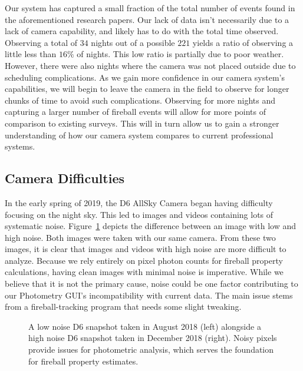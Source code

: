 Our system has captured a small fraction of the total number of events found in the aforementioned research papers.
Our lack of data isn't necessarily due to a lack of camera capability, and likely has to do with the total time observed. 
Observing a total of $34$ nights out of a possible $221$ yields a ratio of observing a little less than $16\%$ of nights. 
This low ratio is partially due to poor weather.
However, there were also nights where the camera was not placed outside due to scheduling complications.
As we gain more confidence in our camera system's capabilities, we will begin to leave the camera in the field to observe for longer chunks of time to avoid such complications.
Observing for more nights and capturing a larger number of fireball events will allow for more points of comparison to existing surveys.
This will in turn allow us to gain a stronger understanding of how our camera system compares to current professional systems.


\subsection{Camera Difficulties}

In the early spring of 2019, the D6 AllSky Camera began having difficulty focusing on the night sky.
This led to images and videos containing lots of systematic noise.  
Figure~\ref{camera_noise} depicts the difference between an image with low and high noise.
Both images were taken with our same camera.
From these two images, it is clear that images and videos with high noise are more difficult to analyze.
Because we rely entirely on pixel photon counts for fireball property calculations, having clean images with minimal noise is imperative.
While we believe that it is not the primary cause, noise could be one factor contributing to our Photometry GUI's incompatibility with current data.
The main issue stems from a fireball-tracking program that needs some slight tweaking.

\begin{figure}[ht!]
  \centering
  \caption[A low noise D6 snapshot taken in August 2018 (left) alongside a high noise D6 snapshot taken in December 2018 (right).]{A low noise D6 snapshot taken in August 2018 (left) alongside a high noise D6 snapshot taken in December 2018 (right).  Noisy pixels provide issues for photometric analysis, which serves the foundation for fireball property estimates.}  
  \label{camera_noise}
\end{figure}

